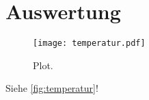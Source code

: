 \section{Auswertung}
\label{sec:Auswertung}

\begin{figure}
  \centering
  \texttt{[image: temperatur.pdf]}
  \caption{Plot.}
  \label{fig:temperatur}
\end{figure}


Siehe \autoref{fig:temperatur}!
